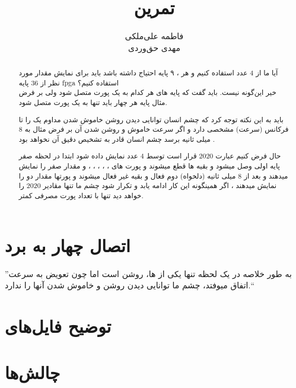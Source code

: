 \documentclass[dvipsnames, svgnames, x11names, a4paper, 11pt]{article}
\title{تمرین \lr{7-Segement}}
\author{
فاطمه علی‌ملکی \\
مهدی حق‌وردی
}
\begin{document}
\maketitle
\tableofcontents

\section{اتصال چهار  به برد }
\begin{abstract}
آیا ما از 4 عدد  استفاده کنیم و هر ، ۹ پایه احتیاج داشته باشد باید برای نمایش مقدار مورد نظر از 36 پایه fpga استفاده کنیم؟ \\

خیر این‌گونه نیست. باید گفت که پایه های
هر کدام به یک پورت متصل شود ولی بر فرض مثال پایه  هر چهار  باید تنها به یک پورت متصل شود.

باید به این نکته توجه کرد که چشم انسان توانایی دیدن روشن خاموش شدن مداوم یک  را تا فرکانس (سرعت) مشخصی دارد و اگر سرعت خاموش و روشن شدن آن بر فرض مثال به 8 میلی ثانیه برسد چشم انسان  قادر به تشخیص دقیق آن نخواهد بود .

حال فرض کنیم عبارت 2020 قرار است توسط 4 عدد  نمایش داده شود ابتدا در لحظه صفر پایه  اولی وصل میشود  و بقیه  ها قطع میشوند و پورت های 
،
،
،
، 
،
 و
مقدار صفر را نمایش میدهند و بعد از 8 میلی ثانیه (دلخواه)  دوم فعال و بقیه غیر فعال میشوند و پورتها مقدار دو را نمایش میدهند ، اگر همینگونه این کار ادامه یابد و تکرار شود چشم ما تنها مقادیر 2020 را خواهد دید تنها با تعداد پورت مصرفی کمتر.
\end{abstract}
''به طور خلاصه در یک لحظه تنها یکی از ها، روشن است اما چون تعویض به سرعت اتفاق میوفتد، چشم ما توانایی دیدن روشن و خاموش شدن آنها را ندارد.``
\section{توضیح فایل‌های }
\section{چالش‌ها}
\end{document}
